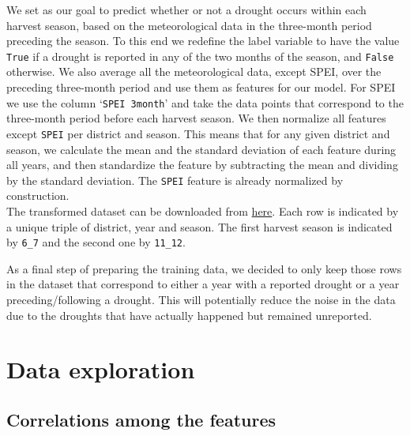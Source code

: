 \documentclass[10pt,parskip=half,
toc=sectionentrywithdots,
bibliography=totocnumbered,
captions=tableheading,numbers=noendperiod]{scrartcl}
\begin{document}
We set as our goal to predict whether or not a drought occurs within
each harvest season, based on the meteorological data in the three-month
period preceding the season. To this end we redefine the label variable
to have the value \texttt{True} if a drought is reported in any of the
two months of the season, and \texttt{False} otherwise. We also average
all the meteorological data, except SPEI, over the preceding three-month
period and use them as features for our model. For SPEI we use the
column `\texttt{SPEI\ 3month}' and take the data points that correspond
to the three-month period before each harvest season. We then normalize
all features except \texttt{SPEI} per district and season. This means
that for any given district and season, we calculate the mean and the
standard deviation of each feature during all years, and then
standardize the feature by subtracting the mean and dividing by the
standard deviation. The \texttt{SPEI} feature is already normalized by
construction.\\
The transformed dataset can be downloaded from
\href{https://github.com/rodekruis/Drought_IBF/blob/master/Model\%20Event\%20Data/datasets/Uganda_seasonal_normalized.csv}{here}.
Each row is indicated by a unique triple of district, year and season.
The first harvest season is indicated by \texttt{6\_7} and the second
one by \texttt{11\_12}.

As a final step of preparing the training data, we decided to only keep
those rows in the dataset that correspond to either a year with a
reported drought or a year preceding/following a drought. This will
potentially reduce the noise in the data due to the droughts that have
actually happened but remained unreported.

\hypertarget{data-exploration}{%
\section{Data exploration}\label{data-exploration}}

\hypertarget{correlations-among-the-features}{%
\subsection{Correlations among the
features}\label{correlations-among-the-features}}
\end{document}
